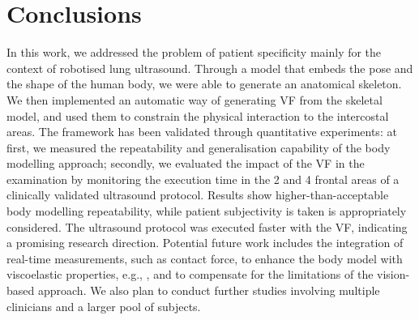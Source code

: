 \cleardoublepage
\chapter{Conclusions}
In this work, we addressed the problem of patient specificity mainly
for the context of robotised lung ultrasound. Through a model that
embeds the pose and the shape of the human body, we were able to
generate an anatomical skeleton. We then implemented an automatic way
of generating VF from the skeletal model, and used
them to constrain the physical interaction to the intercostal areas. The framework has been validated through quantitative experiments:
at first, we measured the repeatability and generalisation capability
of the body modelling approach; secondly, we evaluated the impact of
the VF in the examination by monitoring the execution time in the 2 and 4 frontal areas of a clinically validated ultrasound
protocol. Results show higher-than-acceptable body modelling
repeatability, while patient subjectivity is taken is appropriately considered. The ultrasound protocol was executed faster with the
VF, indicating a promising research direction.
Potential future work includes the integration of real-time
measurements, such as contact force, to enhance the body model with
viscoelastic properties, e.g., \cite{beber2024passive}, and to
compensate for the limitations of the vision-based approach. We also
plan to conduct further studies involving multiple clinicians and a
larger pool of subjects.